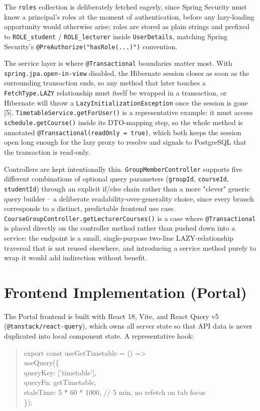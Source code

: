 \documentclass[12pt,a4paper]{report}
\begin{document}
The \texttt{roles} collection is deliberately fetched eagerly, since
Spring Security must know a principal's roles at the moment of
authentication, before any lazy-loading opportunity would otherwise
arise; roles are stored as plain strings and prefixed to
\texttt{ROLE\_student} / \texttt{ROLE\_lecturer} inside
\texttt{UserDetails}, matching Spring Security's
\texttt{@PreAuthorize("hasRole(...)")} convention.

The service layer is where \texttt{@Transactional} boundaries matter
most. With \texttt{spring.jpa.open-in-view} disabled, the Hibernate
session closes as soon as the surrounding transaction ends, so any
method that later touches a \texttt{FetchType.LAZY} relationship must
itself be wrapped in a transaction, or Hibernate will throw a
\texttt{LazyInitializationException} once the session is gone [5].
\texttt{TimetableService.getForUser()} is a representative example: it
must access \texttt{schedule.getCourse()} inside its DTO-mapping step,
so the whole method is annotated \texttt{@Transactional(readOnly =
true)}, which both keeps the session open long enough for the lazy
proxy to resolve and signals to PostgreSQL that the transaction is
read-only.

Controllers are kept intentionally thin. \texttt{GroupMemberController}
supports five different combinations of optional query parameters
(\texttt{groupId}, \texttt{courseId}, \texttt{studentId}) through an
explicit if/else chain rather than a more "clever" generic query
builder -- a deliberate readability-over-generality choice, since every
branch corresponds to a distinct, predictable frontend use case.
\texttt{CourseGroupController.getLecturerCourses()} is a case where
\texttt{@Transactional} is placed directly on the controller method
rather than pushed down into a service: the endpoint is a small,
single-purpose two-line LAZY-relationship traversal that is not reused
elsewhere, and introducing a service method purely to wrap it would add
indirection without benefit.

\section{Frontend Implementation (Portal)}

The Portal frontend is built with React 18, Vite, and React Query v5
(\texttt{@tanstack/react-query}), which owns all server state so that
API data is never duplicated into local component state. A
representative hook:

\begin{quote}
\ttfamily\footnotesize
\noindent export const useGetTimetable = () =>\\
\hphantom{xx}useQuery(\{\\
\hphantom{xxxx}queryKey: ['timetable'],\\
\hphantom{xxxx}queryFn: getTimetable,\\
\hphantom{xxxx}staleTime: 5 * 60 * 1000, // 5 min, no refetch on tab focus\\
\hphantom{xx}\});
\end{quote}
\end{document}
